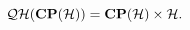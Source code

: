 \begin{equation}
{\cal QH}({\bf CP}({\cal H})) = {\bf CP}({\cal H})\times {\cal H}.
\label{tuttr}
\end{equation}

